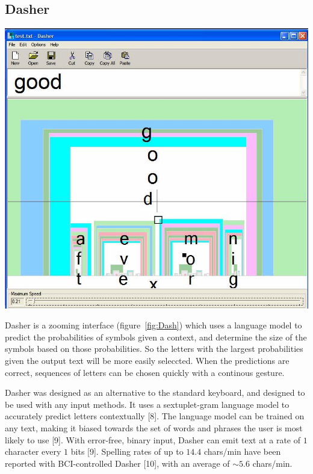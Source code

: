 \documentclass[12pt,titlepage]{article}
\begin{document}
\subsection{Dasher}

\begin{center}
	\includegraphics[scale=0.40]{figure4.jpeg}
	\label{fig:Dash}
\end{center}


Dasher is a zooming interface (figure~\ref{fig:Dash}) which uses a language model to predict the probabilities of 
symbols given a context, and determine the size of the symbols based on those probabilities.  So the 
letters with the largest probabilities given the output text will be more easily seleccted.  When the 
predictions are correct, sequences of letters can be chosen quickly with a continous gesture.

Dasher was designed as an alternative to the standard keyboard, and designed to be used with any input 
methods.  It uses a sextuplet-gram language model to accurately predict letters contextually [8]. The 
language model can be trained on any text, making it biased towards the set of words and phrases the 
user is most likely to use [9].  With error-free, binary input, Dasher can emit text at a rate of $1$ character 
every $1$ bits [9].  Spelling rates of up to $14.4$ chars/min have been reported with BCI-controlled Dasher [10], 
with an average of $\sim5.6$ chars/min.
\end{document}
